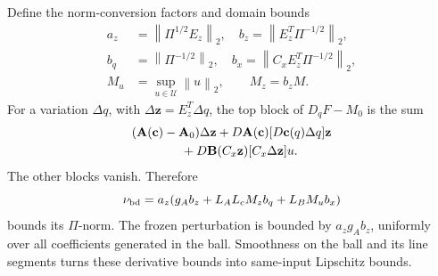 \documentclass[journal]{IEEEtran}
\theoremstyle{plain}
\theoremstyle{definition}
\newcommand{\vz}{\mathbf{z}}
\newcommand{\vc}{\mathbf{c}}
\newcommand{\mA}{\mathbf{A}}
\newcommand{\mB}{\mathbf{B}}
\newcommand{\norm}[1]{\left\lVert #1\right\rVert}
\begin{document}
Define the norm-conversion factors and domain bounds
\begin{equation}
\begin{split}
a_z&=\norm{\Pi^{1/2}E_z}_2,\quad
b_z=\norm{E_z^T\Pi^{-1/2}}_2,\\
b_q&=\norm{\Pi^{-1/2}}_2,\quad
b_x=\norm{C_xE_z^T\Pi^{-1/2}}_2,\\
M_u&=\sup_{u\in\mathcal U}\norm{u}_2,\qquad M_z=b_zM.
\end{split}
\label{eq:norm_conversion}
\end{equation}
For a variation $\Delta q$, with $\Delta\vz=E_z^T\Delta q$, the top block of $D_qF-M_0$ is the sum
\begin{equation}
\begin{split}
&(\mA(\vc)-\mA_0)\Delta\vz
+D\mA(\vc)[D\vc(q)\Delta q]\vz\\
&\hspace{14mm}+D\mB(C_x\vz)[C_x\Delta\vz]u.
\end{split}
\label{eq:full_derivative}
\end{equation}
The other blocks vanish. Therefore
\begin{equation}
\nu_{\rm bd}=a_z(g_A b_z+L_A L_cM_zb_q+L_BM_ub_x)
\label{eq:derivative_budget}
\end{equation}
bounds its $\Pi$-norm. The frozen perturbation is bounded by $a_zg_A b_z$, uniformly over all coefficients generated in the ball. Smoothness on the ball and its line segments turns these derivative bounds into same-input Lipschitz bounds.
\end{document}
